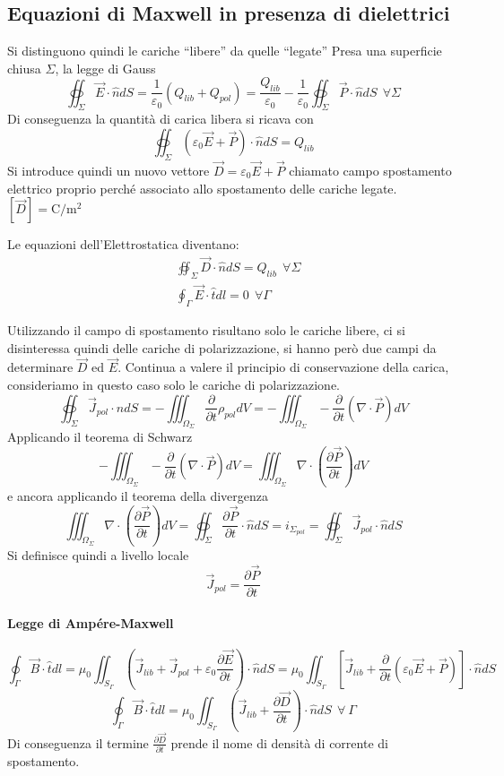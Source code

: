 \subsection{Equazioni di Maxwell in presenza di dielettrici}
Si distinguono quindi le cariche ``libere'' da quelle ``legate''
Presa una superficie chiusa $\Sigma$, la legge di Gauss
$$
\oiint_\Sigma \vec{E}\cdot\hat{n}dS = \frac{1}{\varepsilon_0}(Q_{lib}+Q_{pol}) = \frac{Q_{lib}}{\varepsilon_0} - \frac{1}{\varepsilon_0} \oiint_{\Sigma} \vec{P}\cdot\hat{n}dS \ \ \forall\Sigma
$$
Di conseguenza la quantità di carica libera si ricava con
$$
\oiint_{\Sigma} (\varepsilon_0\vec{E}+\vec{P})\cdot \hat{n}dS = 
Q_{lib}
$$
Si introduce quindi un nuovo vettore $\vec{D} = \varepsilon_0\vec{E} + \vec{P}$ chiamato campo spostamento elettrico proprio perché associato allo spostamento delle cariche legate.
$[\vec{D}] = \si{\coulomb\per\meter^2}$

Le equazioni dell'Elettrostatica diventano:
\begin{align*}
&\oiint_{\Sigma}\vec{D}\cdot\hat{n}dS = Q_{lib}\ \ \forall\Sigma \\
&\oint_{\Gamma} \vec{E}\cdot\hat{t}dl = 0 \ \ \forall \Gamma
\end{align*}

Utilizzando il campo di spostamento risultano solo le cariche 
libere, ci si disinteressa quindi delle cariche di polarizzazione,
si hanno però due campi da determinare $\vec{D}$ ed $\vec{E}$.
Continua a valere il principio di conservazione della carica, 
consideriamo in questo caso solo le cariche di polarizzazione.
$$
\oiint_\Sigma\vec{J}_{pol}\cdot\hat{n}dS = 
- \iiint_{\Omega_\Sigma}\frac{\partial}{\partial t} \rho_{pol}dV
= -\iiint_{\Omega_\Sigma} -\frac{\partial}{\partial t} 
(\nabla\cdot\vec{P})dV 
$$
Applicando il teorema di Schwarz
$$
-\iiint_{\Omega_\Sigma} -\frac{\partial}{\partial t} 
(\nabla\cdot\vec{P})dV = \iiint_{\Omega_\Sigma} \nabla\cdot\left(\frac{\partial\vec{P}}{\partial t}\right)dV
$$
e ancora applicando il teorema della divergenza
$$
\iiint_{\Omega_\Sigma} \nabla\cdot\left(\frac{\partial\vec{P}}{\partial t}\right)dV = \oiint_{\Sigma}\frac{\partial \vec{P}}{\partial t} \cdot \hat{n}dS = i_{\Sigma_{pol}} = \oiint_\Sigma\vec{J}_{pol}\cdot\hat{n}dS
$$
Si definisce quindi a livello locale
$$
\vec{J}_{pol} = \frac{\partial \vec{P}}{\partial t}
$$

\paragraph{Legge di Ampére-Maxwell}
$$
\oint_{\Gamma} \vec{B}\cdot\hat{t} dl = \mu_0 \iint_{S_\Gamma}\left( \vec{J}_{lib} + \vec{J}_{pol} + \varepsilon_0\frac{\partial 
\vec{E}}{\partial t}\right) \cdot \hat{n}dS =
\mu_0 \iint_{S_\Gamma}\left[\vec{J}_{lib} + 
\frac{\partial}{\partial t} \left(\varepsilon_0\vec{E}+\vec{P}\right)\right] \cdot \hat{n}dS 
$$
$$
\oint_{\Gamma} \vec{B}\cdot \hat{t} dl = \mu_0 \iint_{S_\Gamma} 
\left(\vec{J}_{lib} + \frac{\partial \vec{D}}{\partial t}\right)\cdot
\hat{n}dS\ \ \forall\ \Gamma
$$
Di conseguenza il termine $\frac{\partial \vec{D}}{\partial t}$ prende
il nome di densità di corrente di spostamento.

